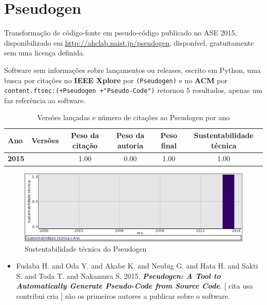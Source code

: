 \section{Pseudogen}

Transformação de código-fonte em pseudo-código
publicado no ASE 2015,
disponibilizado em \url{http://ahclab.naist.jp/pseudogen},
disponível,
gratuitamente
sem uma licença definida.

Software sem informações sobre lançamentos ou releases,
escrito em Python,
uma busca por citações no {\bf IEEE Xplore} por
\texttt{(Pseudogen)}
e no {\bf ACM} por
\texttt{content.ftsec:(+Pseudogen +"Pseudo-Code")}
retornou
5 resultados,
apenas um faz referência ao software.


\begin{table}[H]
\caption{Versões lançadas e número de citações ao Pseudogen por ano}
\centering
\begin{tabular}{| l | c | c | c | c | c |}
  \hline
  Ano & Versões & Peso da citação & Peso da autoria & Peso final & Sustentabilidade técnica \\
  \hline
            {\bf 2015}
          &
          
          &
          1.00
          &
          0.00
          &
          1.00
          &
            {\color{blue} 1.00}
          \\
\hline
\end{tabular}
\end{table}

\begin{figure}[h]
  \center
  \includegraphics[scale=0.50]{imagens/softwares-charts/pseudogen.png}
  \caption{Sustentabilidade técnica do Pseudogen}
\end{figure}


\begin{itemize}
\item Fudaba H. and Oda Y. and Akabe K. and Neubig G. and Hata H. and Sakti S. and Toda T. and Nakamura S.
      2015.
        \textbf{\textit{ Pseudogen: A Tool to Automatically Generate Pseudo-Code from Source Code}}.
      [
          cita
          usa
          contribui
          cria
      ]
são os primeiros autores a publicar sobre o software.
\end{itemize}
